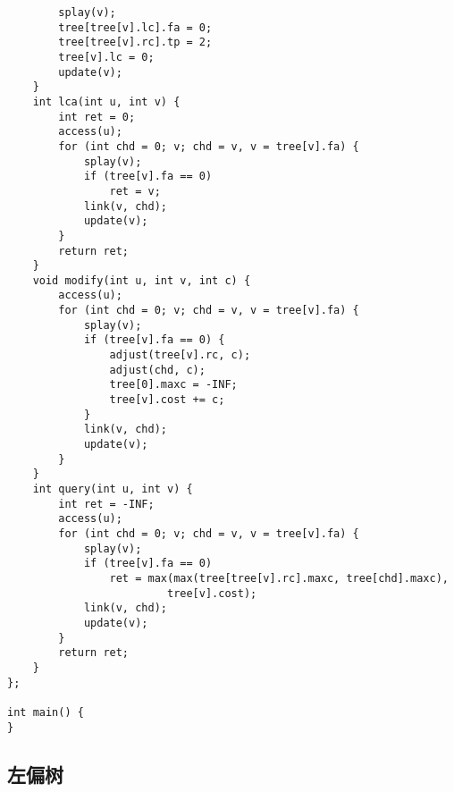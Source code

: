 \documentclass{article}
\begin{document}
\begin{lstlisting}
        splay(v);
        tree[tree[v].lc].fa = 0;
        tree[tree[v].rc].tp = 2;
        tree[v].lc = 0;
        update(v);
    }
    int lca(int u, int v) {
        int ret = 0;
        access(u);
        for (int chd = 0; v; chd = v, v = tree[v].fa) {
            splay(v);
            if (tree[v].fa == 0)
                ret = v;
            link(v, chd);
            update(v);
        }
        return ret;
    }
    void modify(int u, int v, int c) {
        access(u);
        for (int chd = 0; v; chd = v, v = tree[v].fa) {
            splay(v);
            if (tree[v].fa == 0) {
                adjust(tree[v].rc, c);
                adjust(chd, c);
                tree[0].maxc = -INF;
                tree[v].cost += c;
            }
            link(v, chd);
            update(v);
        }
    }
    int query(int u, int v) {
        int ret = -INF;
        access(u);
        for (int chd = 0; v; chd = v, v = tree[v].fa) {
            splay(v);
            if (tree[v].fa == 0)
                ret = max(max(tree[tree[v].rc].maxc, tree[chd].maxc),
                         tree[v].cost);
            link(v, chd);
            update(v);
        }
        return ret;
    }
};

int main() {
}
\end{lstlisting}

\subsection{左偏树}
\end{document}
